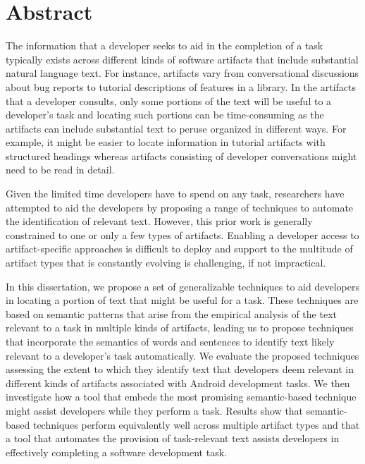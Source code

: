 

\chapter*{Abstract}

The information that a developer seeks to aid in the completion of a task typically exists across different kinds of software artifacts that include substantial natural language text. For instance,
artifacts vary from conversational discussions about bug reports to tutorial descriptions of features in a library.
In the artifacts that a developer consults, only some portions of the text will be useful to a developer's task
and locating such portions can be time-consuming as the artifacts can include substantial text to peruse organized in different ways. For example, it might be easier to locate information
in tutorial artifacts with structured headings whereas artifacts consisting of developer conversations might need to be read in detail. 

Given the limited time developers have to spend on any task, researchers have 
attempted to aid the developers by proposing a range of techniques to automate the identification of relevant text. 
However, this prior work is generally constrained to one or only a few types of artifacts.  
Enabling a developer access to artifact-specific approaches is difficult to deploy
and support to the multitude of artifact types that is constantly evolving
is challenging, if not impractical.

In this dissertation, we propose a set of generalizable techniques to aid developers in locating a portion of text that might be useful for a task. These techniques are based on semantic patterns that arise from the empirical analysis of the text relevant to a task in multiple kinds of artifacts, leading us to propose techniques that incorporate the semantics of words and sentences to identify text likely relevant to a developer's task automatically.
We evaluate the proposed techniques assessing the extent to which they identify text that developers deem relevant in different kinds of artifacts associated with Android development tasks. We then investigate how a tool that embeds the most promising semantic-based technique might assist developers while they perform a task. Results show that semantic-based techniques perform equivalently well across multiple artifact types and that a tool that automates the provision of task-relevant text assists developers in effectively completing a software development task.
    

